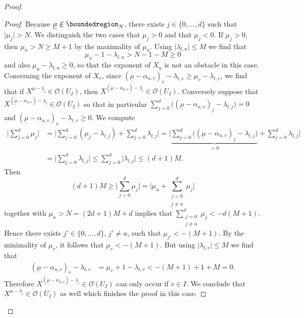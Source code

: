 \documentclass[a4paper, reqno, 10pt]{amsart}
\theoremstyle{definition}
\numberwithin{equation}{section}
\newcommand{\abs}[1]{{\lvert{#1}\rvert}}
\newcommand{\ul}[1]{{\underline{#1}}}
\newcommand{\CO}{{\mathcal {O}}}
\begin{document}
\begin{proof}
\begin{proof}
		
		Because $\ul{\mu}\notin \boundedregion_N$, there exists $j\in \{0,\ldots,d\}$ such that $\abs{\mu_j} > N$.
		We distinguish the two cases that $\mu_j >0$ and that $\mu_j <0$.
		If $\mu_j>0$, then $\mu_u > N\geq M+1$ by the maximality of $\mu_u$.
		Using $\abs{\lambda_{l,u}} \leq M$ we find that
		\begin{equation*}
			\mu_u -1 - \lambda_{l,u} > N - 1 - M \geq 0
		\end{equation*}
		and also $\mu_u -\lambda_{l,u} \geq 0$, so that the exponent of $X_u$ is not an obstacle in this case.
		Concerning the exponent of $X_v$, since $(\ul{\mu}-\alpha_{u,v})_v - \lambda_{l,v} \geq \mu_v - \lambda_{l,v}$, we find that if $X^{\ul{\mu}-\ul{\lambda}_l} \in \CO(U_I)$, then $X^{(\ul{\mu}-\alpha_{u,v})-\ul{\lambda}_l} \in \CO(U_I)$.
		Conversely suppose that $X^{(\ul{\mu}-\alpha_{u,v})-\ul{\lambda}_l} \in \CO(U_I)$ so that in particular $\sum_{j=0}^d \big( (\ul{\mu}-\alpha_{u,v})_j - \lambda_{l,j} \big) =0$ and $(\ul{\mu}-\alpha_{u,v})_v - \lambda_{l,v} \geq 0$.
		We compute
		\begin{align*}
			\bigg\lvert \sum_{j=0}^d \mu_j \bigg\rvert
			&= \bigg\lvert \sum_{j=0}^d (\mu_j - \lambda_{l,j}) + \sum_{j=0}^d \lambda_{l,j} \bigg\rvert 
			= \bigg\lvert \underset{=0}{\underbrace{\sum_{j=0}^d \big( (\ul{\mu}-\alpha_{u,v})_j - \lambda_{l,j} \big)}} + \sum_{j=0}^d \lambda_{l,j} \bigg\rvert \\
			&= \bigg\lvert \sum_{j=0}^d \lambda_{l,j} \bigg\rvert
			\leq \sum_{j=0}^d \abs{\lambda_{l,j}} 
			\leq (d+1) M .
		\end{align*}
		Then 
		\begin{equation*}
			(d+1) M \geq \bigg\lvert \sum_{j=0}^d \mu_j \bigg\rvert = \bigg\lvert \mu_u + \sum_{\substack{j=0 \\ j\neq u}}^d \mu_j \bigg\rvert
		\end{equation*}
		together with $\mu_u > N = (2d+1)M +d$ implies that $ \sum_{\substack{j=0 \\ j\neq u}}^d \mu_j  < -d (M+1)$.
		Hence there exists $j'\in \{0,\ldots,d\}$, $j'\neq u$, such that $\mu_{j'} < -(M+1)$.
		By the minimality of $\mu_v$, it follows that $\mu_v < -(M+1)$.
		But using $\abs{\lambda_{l,v}} \leq M$ we find that
		\begin{align*}
			(\ul{\mu}-\alpha_{u,v})_v - \lambda_{l,v} 
			&= \mu_v +1 - \lambda_{l,v}
			< -(M+1) +1 +M
			=0 .
		\end{align*}
		Therefore $X^{(\ul{\mu}-\alpha_{u,v})-\ul{\lambda}_l} \in \CO(U_I)$ can only occur if $v\in I$.
		We conclude that $X^{\ul{\mu}-\ul{\lambda}_l} \in \CO(U_I)$ as well which finishes the proof in this case.
		

\end{proof}
\end{proof}
\end{document}
